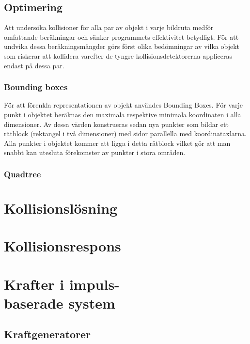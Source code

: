 \documentclass[a4paper,12pt,twopage,swedish]{article}
\begin{document}
\subsection{Optimering}

Att undersöka kollisioner för alla par av objekt i varje bildruta medför omfattande beräkningar och sänker programmets effektivitet betydligt. För att undvika dessa beräkningsmängder görs först olika bedömningar av vilka objekt som riskerar att kollidera varefter de tyngre kollisionsdetektorerna appliceras endast på dessa par.

\subsubsection{Bounding boxes}

För att förenkla representationen av objekt användes Bounding Boxes. För varje punkt i objektet beräknas den maximala respektive minimala koordinaten i alla dimensioner. Av dessa värden konstrueras sedan nya punkter som bildar ett rätblock (rektangel i två dimensioner) med sidor parallella med koordinataxlarna. Alla punkter i objektet kommer att ligga i detta rätblock vilket gör att man snabbt kan utesluta förekomster av punkter i stora områden.

\subsubsection{Quadtree}


\section{Kollisionslösning}
\section{Kollisionsrespons}
\section{Krafter i impuls-\\baserade system}

\subsection{Kraftgeneratorer}
\end{document}
